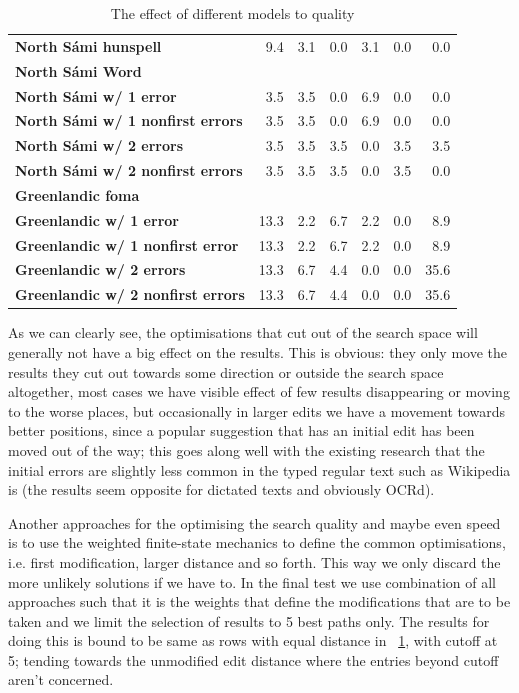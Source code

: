 \documentclass[a4paper,12pt]{article}
\begin{document}
\begin{table}
\begin{tabular}{|l|r|r|r|r|r|r|}
        \bf North Sámi hunspell & 9.4 & 3.1 & 0.0 & 3.1 & 0.0 & 0.0 \\
            \bf North Sámi Word & & \\
        \hline
        \bf North Sámi w/ 1 error & 3.5 & 3.5 & 0.0 & 6.9 & 0.0 & 0.0 \\
        \bf North Sámi w/ 1 nonfirst errors & 3.5 & 3.5 & 0.0 & 6.9 & 0.0 & 0.0\\
        \bf North Sámi w/ 2 errors & 3.5 & 3.5 & 3.5 & 0.0 & 3.5 & 3.5 \\
        \bf North Sámi w/ 2 nonfirst errors & 3.5 & 3.5 & 3.5 & 0.0 & 3.5 & 0.0\\
        \hline
        \bf Greenlandic foma &  \\
        \hline
          \bf Greenlandic w/ 1 error & 13.3 & 2.2 & 6.7 & 2.2 & 0.0 & 8.9 \\
 \bf Greenlandic w/ 1 nonfirst error & 13.3 & 2.2 & 6.7 & 2.2 & 0.0 & 8.9 \\
         \bf Greenlandic w/ 2 errors & 13.3 & 6.7 & 4.4 & 0.0 & 0.0 & 35.6 \\
\bf Greenlandic w/ 2 nonfirst errors & 13.3 & 6.7 & 4.4 & 0.0 & 0.0 & 35.6 \\
        \hline
    \end{tabular}
    \caption{The effect of different models to quality
    \label{table:quality}}
\end{table}

As we can clearly see, the optimisations that cut out of the search space will
generally not have a big effect on the results. This is obvious: they only move
the results they cut out towards some direction or outside the search space
altogether, most cases we have visible effect of few results disappearing or
moving to the worse places, but occasionally in larger edits we have a movement
towards better positions, since a popular suggestion that has an initial edit
has been moved out of the way; this goes along well with the existing research
that the initial errors are slightly less common in the typed regular text such
as Wikipedia is (the results seem opposite for dictated texts and obviously
OCRd).

Another approaches for the optimising the search quality and maybe even speed
is to use the weighted finite-state mechanics to define the common
optimisations, i.e. first modification, larger distance and so forth. This way
we only discard the more unlikely solutions if we have to. In the final test we
use combination of all approaches such that it is the weights that define the
modifications that are to be taken and we limit the selection of results to 5
best paths only. The results for doing this is bound to be same as rows with
equal distance in ~\ref{table:quality}, with cutoff at 5; tending
towards the unmodified edit distance where the entries beyond cutoff aren't
concerned.
\end{document}

